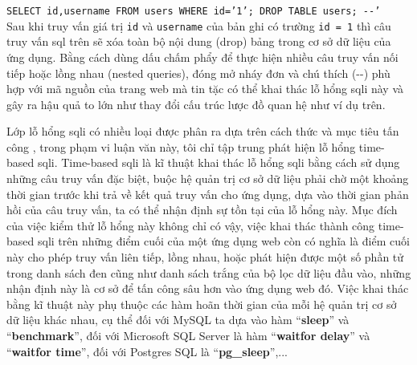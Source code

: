 \colorbox{gray!30}{\texttt{SELECT id,username FROM users WHERE id='1'; DROP TABLE users; -{}-'}}\\
Sau khi truy vấn giá trị \texttt{id} và \texttt{username} của bản ghi có trường \texttt{id = 1} thì câu truy vấn \acrshort{sql} trên sẽ xóa toàn bộ nội dung (drop) bảng  trong cơ sở dữ liệu của ứng dụng. Bằng cách dùng dấu chấm phẩy để thực hiện nhiều câu truy vấn nối tiếp hoặc lồng nhau (nested queries), đóng mở nháy đơn và chú thích (-{}-) phù hợp với mã nguồn của trang web mà tin tặc có thể khai thác lỗ hổng \acrshort{sqli} này và gây ra hậu quả to lớn như thay đổi cấu trúc lược đồ quan hệ như ví dụ trên.\par
Lớp lỗ hổng \acrshort{sqli} có nhiều loại được phân ra dựa trên cách thức và mục tiêu tấn công \parencite{sqli-classification}, trong phạm vi luận văn này, tôi chỉ tập trung phát hiện lỗ hổng time-based \acrshort{sqli}. Time-based \acrshort{sqli} là kĩ thuật khai thác lỗ hổng \acrshort{sqli} bằng cách sử dụng những câu truy vấn đặc biệt, buộc hệ quản trị cơ sở dữ liệu phải chờ một khoảng thời gian trước khi trả về kết quả truy vấn cho ứng dụng, dựa vào thời gian phản hồi của câu truy vấn, ta có thể nhận định sự tồn tại của lỗ hổng này. Mục đích của việc kiểm thử lỗ hổng này không chỉ có vậy, việc khai thác thành công time-based \acrshort{sqli} trên những điểm cuối của một ứng dụng web còn có nghĩa là điểm cuối này cho phép truy vấn liên tiếp, lồng nhau, hoặc phát hiện được một số phần tử trong danh sách đen cũng như danh sách trắng của bộ lọc dữ liệu đầu vào, những nhận định này là cơ sở để tấn công sâu hơn vào ứng dụng web đó. Việc khai thác bằng kĩ thuật này phụ thuộc các hàm hoãn thời gian của mỗi hệ quản trị cơ sở dữ liệu khác nhau, cụ thể đối với MySQL ta dựa vào hàm ``\textbf{sleep}'' và ``\textbf{benchmark}'', đối với Microsoft SQL Server là hàm ``\textbf{waitfor delay}'' và ``\textbf{waitfor time}'', đối với Postgres SQL là ``\textbf{pg\_sleep}'',...\par
